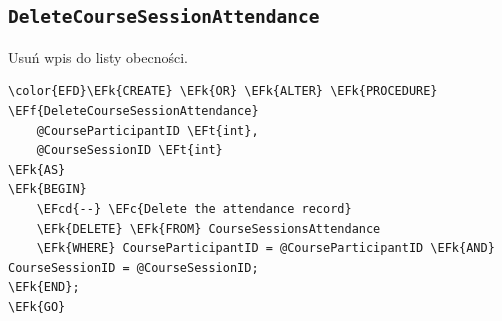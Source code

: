 \documentclass[11pt]{article}
\newcommand{\EFc}[1]{\textcolor{EFc}{\textit{#1}}} %
\newcommand{\EFcd}[1]{\textcolor{EFcd}{\textit{#1}}} %
\newcommand{\EFk}[1]{\textcolor{EFk}{\textbf{#1}}} %
\newcommand{\EFf}[1]{\textcolor{EFf}{#1}} %
\newcommand{\EFt}[1]{\textcolor{EFt}{\textbf{#1}}} %
\begin{document}
\subsection{\texttt{DeleteCourseSessionAttendance}}
\label{sec:org0ed2976}
Usuń wpis do listy obecności.
\begin{Code}
\begin{Verbatim}
\color{EFD}\EFk{CREATE} \EFk{OR} \EFk{ALTER} \EFk{PROCEDURE} \EFf{DeleteCourseSessionAttendance}
    @CourseParticipantID \EFt{int},
    @CourseSessionID \EFt{int}
\EFk{AS}
\EFk{BEGIN}
    \EFcd{--} \EFc{Delete the attendance record}
    \EFk{DELETE} \EFk{FROM} CourseSessionsAttendance
    \EFk{WHERE} CourseParticipantID = @CourseParticipantID \EFk{AND} CourseSessionID = @CourseSessionID;
\EFk{END};
\EFk{GO}
\end{Verbatim}
\end{Code}
\end{document}
